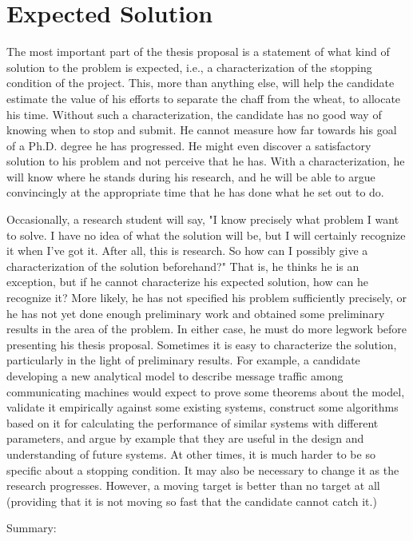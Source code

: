 \section{Expected Solution}\label{sec:shape}

The most important part of the thesis proposal is a statement of what kind of solution to the problem is expected, i.e., a characterization of the stopping condition of the project. This, more than anything else, will help the candidate estimate the value of his efforts to separate the chaff from the wheat, to allocate his time. Without such a characterization, the candidate has no good way of knowing when to stop and submit. He cannot measure how far towards his goal of a Ph.D. degree he has progressed. He might even discover a satisfactory solution to his problem and not perceive that he has. With a characterization, he will know where he stands during his research, and he will be able to argue convincingly at the appropriate time that he has done what he set out to do.

Occasionally, a research student will say, "I know precisely what problem I want to solve. I have no idea of what the solution will be, but I will certainly recognize it when I've got it. After all, this is research. So how can I possibly give a characterization of the solution beforehand?" That is, he thinks he is an exception, but if he cannot characterize his expected solution, how can he recognize it? More likely, he has not specified his problem sufficiently precisely, or he has not yet done enough preliminary work and obtained some preliminary results in the area of the problem. In either case, he must do more legwork before presenting his thesis proposal. Sometimes it is easy to characterize the solution, particularly in the light of preliminary results. For example, a candidate developing a new analytical model to describe message traffic among communicating machines would expect to prove some theorems about the model, validate it empirically against some existing systems, construct some algorithms based on it for calculating the performance of similar systems with different parameters, and argue by example that they are useful in the design and understanding of future systems. At other times, it is much harder to be so specific about a stopping condition. It may also be necessary to change it as the research progresses. However, a moving target is better than no target at all (providing that it is not moving so fast that the candidate cannot catch it.)

Summary:


